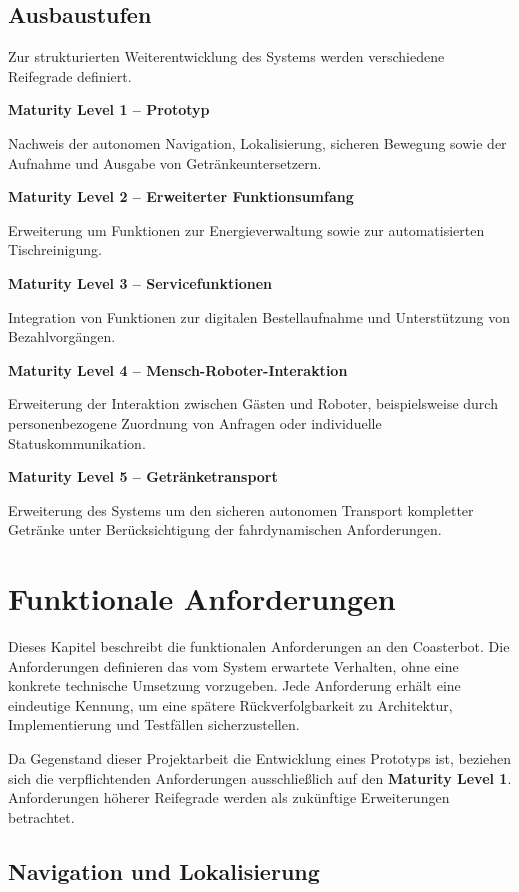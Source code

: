\subsection{Ausbaustufen}\label{ausbaustufen}

Zur strukturierten Weiterentwicklung des Systems werden verschiedene
Reifegrade definiert.

\textbf{Maturity Level 1 -- Prototyp}

Nachweis der autonomen Navigation, Lokalisierung, sicheren Bewegung
sowie der Aufnahme und Ausgabe von Getränkeuntersetzern.

\textbf{Maturity Level 2 -- Erweiterter Funktionsumfang}

Erweiterung um Funktionen zur Energieverwaltung sowie zur
automatisierten Tischreinigung.

\textbf{Maturity Level 3 -- Servicefunktionen}

Integration von Funktionen zur digitalen Bestellaufnahme und
Unterstützung von Bezahlvorgängen.

\textbf{Maturity Level 4 -- Mensch-Roboter-Interaktion}

Erweiterung der Interaktion zwischen Gästen und Roboter, beispielsweise
durch personenbezogene Zuordnung von Anfragen oder individuelle
Statuskommunikation.

\textbf{Maturity Level 5 -- Getränketransport}

Erweiterung des Systems um den sicheren autonomen Transport kompletter
Getränke unter Berücksichtigung der fahrdynamischen Anforderungen.

\section{Funktionale Anforderungen}\label{funktionale-anforderungen}

Dieses Kapitel beschreibt die funktionalen Anforderungen an den
Coasterbot. Die Anforderungen definieren das vom System erwartete
Verhalten, ohne eine konkrete technische Umsetzung vorzugeben. Jede
Anforderung erhält eine eindeutige Kennung, um eine spätere
Rückverfolgbarkeit zu Architektur, Implementierung und Testfällen
sicherzustellen.

Da Gegenstand dieser Projektarbeit die Entwicklung eines Prototyps ist,
beziehen sich die verpflichtenden Anforderungen ausschließlich auf den
\textbf{Maturity Level 1}. Anforderungen höherer Reifegrade werden als
zukünftige Erweiterungen betrachtet.

\subsection{Navigation und
Lokalisierung}\label{navigation-und-lokalisierung}

